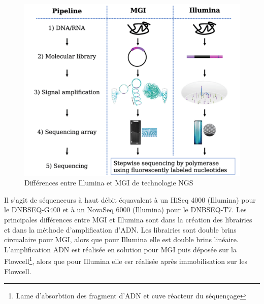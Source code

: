 
\begin{minipage}{0.45\textwidth}
	\begin{figure}[H]
        \centering
        \includegraphics[width=1\textwidth]{img/MGI_vs_Illumina.png}
        \caption{\footnotesize{Différences entre Illumina et MGI de technologie NGS}}
        \label{fig-Illu-vs-MGI}
    \end{figure}
\end{minipage} 
\hfill
\begin{minipage}{0.45\textwidth}
    Il s'agit de séquenceurs à haut débit équavalent à un HiSeq 4000 (Illumina) pour le DNBSEQ-G400 et à un NovaSeq 6000 (Illumina) pour le DNBSEQ-T7. Les principales différences entre MGI et Illumina sont dans la création des librairies et dans la méthode d'amplification d'ADN. Les librairies sont double brins circualaire pour MGI, alors que pour Illumina elle est double brins linéaire. L'amplification ADN est réalisée en solution pour MGI puis déposée sur la Flowcell\footnote{Lame d'absorbtion des fragment d'ADN et cuve réacteur du séquençage}, alors que pour Illumina elle esr réalisée après immobilisation sur les Flowcell.
\end{minipage}

